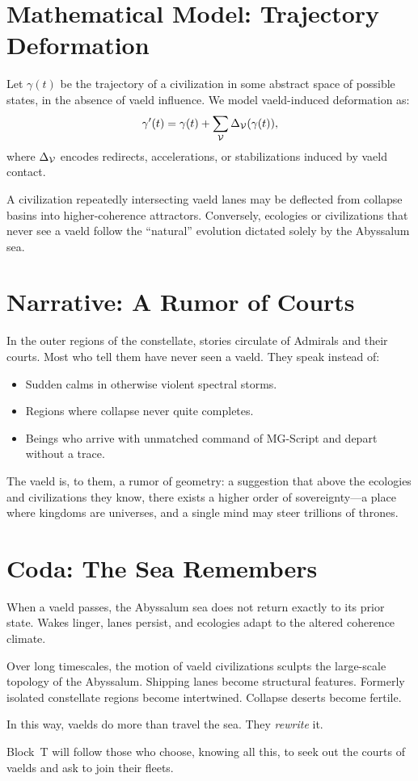 \section{Mathematical Model: Trajectory Deformation}
Let $\gamma(t)$ be the trajectory of a civilization in some abstract space of possible states, in
the absence of vaeld influence. We model vaeld-induced deformation as:
\[
\gamma'(t) = \gamma(t) + \sum_{\mathcal{V}} \Delta_{\mathcal{V}}(\gamma(t)),
\]
where $\Delta_{\mathcal{V}}$ encodes redirects, accelerations, or stabilizations induced by vaeld
contact.

A civilization repeatedly intersecting vaeld lanes may be deflected from collapse basins into
higher-coherence attractors. Conversely, ecologies or civilizations that never see a vaeld follow
the ``natural'' evolution dictated solely by the Abyssalum sea.

\section{Narrative: A Rumor of Courts}
In the outer regions of the constellate, stories circulate of Admirals and their courts. Most who
tell them have never seen a vaeld. They speak instead of:

\begin{itemize}
  \item Sudden calms in otherwise violent spectral storms.
  \item Regions where collapse never quite completes.
  \item Beings who arrive with unmatched command of MG-Script and depart without a trace.
\end{itemize}

The vaeld is, to them, a rumor of geometry: a suggestion that above the ecologies and
civilizations they know, there exists a higher order of sovereignty---a place where kingdoms are
universes, and a single mind may steer trillions of thrones.

\section*{Coda: The Sea Remembers}
When a vaeld passes, the Abyssalum sea does not return exactly to its prior state. Wakes linger,
lanes persist, and ecologies adapt to the altered coherence climate.

Over long timescales, the motion of vaeld civilizations sculpts the large-scale topology of the
Abyssalum. Shipping lanes become structural features. Formerly isolated constellate regions become
intertwined. Collapse deserts become fertile.

In this way, vaelds do more than travel the sea. They \emph{rewrite} it.

Block~T will follow those who choose, knowing all this, to seek out the courts of vaelds and ask to
join their fleets.
